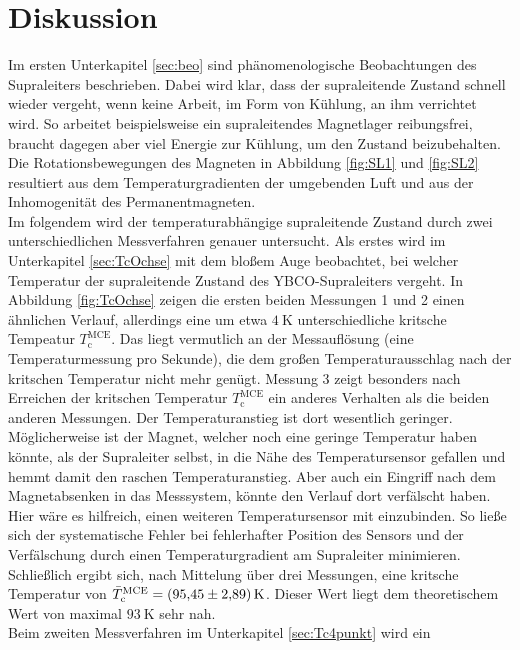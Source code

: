 \section{Diskussion}
\label{sec:Diskussion}

Im ersten Unterkapitel \ref{sec:beo} sind phänomenologische Beobachtungen des Supraleiters
beschrieben. Dabei wird klar, dass der supraleitende Zustand schnell wieder vergeht,
wenn keine Arbeit, im Form von Kühlung, an ihm verrichtet wird. So arbeitet
beispielsweise ein supraleitendes Magnetlager reibungsfrei, braucht dagegen
aber viel Energie zur Kühlung, um den Zustand beizubehalten. Die Rotationsbewegungen
des Magneten in Abbildung \ref{fig:SL1} und \ref{fig:SL2} resultiert aus dem
Temperaturgradienten der umgebenden Luft und aus der Inhomogenität des Permanentmagneten.\\
Im folgendem wird der temperaturabhängige supraleitende
Zustand durch zwei unterschied{\-}lichen Messverfahren genauer untersucht. Als
erstes wird im Unterkapitel \ref{sec:TcOchse} mit dem bloßem Auge beobachtet,
bei welcher Temperatur der supraleitende Zustand des YBCO-Supraleiters vergeht.
In Abbildung \ref{fig:TcOchse} zeigen die ersten beiden Messungen 1 und 2 einen
ähnlichen Verlauf, allerdings eine um etwa $\SI{4}{\kelvin}$ unterschiedliche
kritsche Tempeatur $T^{\text{MCE}}_{\text{c}}$.
Das liegt vermutlich an der Messauflösung (eine Temperaturmessung pro Sekunde),
die dem großen Temperaturausschlag nach der kritschen Temperatur nicht mehr genügt.
Messung 3 zeigt besonders nach Erreichen der kritschen Temperatur $T^{\text{MCE}}_{\text{c}}$
ein anderes Verhalten als die beiden anderen Messungen. Der Temperaturanstieg
ist dort wesentlich geringer. Möglicherweise ist der Magnet, welcher noch eine
geringe Temperatur haben könnte, als der Supraleiter selbst, in die Nähe des
Temperatursensor gefallen und hemmt damit den raschen Temperaturanstieg. Aber auch
ein Eingriff nach dem Magnetabsenken in das Messsystem, könnte den Verlauf dort
verfälscht haben.
Hier wäre es hilfreich, einen weiteren Temperatursensor mit einzubinden.
So ließe sich der systematische Fehler bei fehlerhafter Position des Sensors und
der Verfälschung durch einen Temperaturgradient am Supraleiter minimieren.
Schließlich ergibt sich, nach Mittelung über drei Messungen, eine kritsche Temperatur
von $\bar{T}^{\text{MCE}}_{\text{c}} = \SI{95.45\pm2.89}{\kelvin}$. Dieser Wert
liegt dem theoretischem Wert von maximal $\SI{93}{\kelvin}$ \cite[S. 62]{Hohenester}
sehr nah. \\
Beim zweiten Messverfahren im Unterkapitel \ref{sec:Tc4punkt} wird ein

